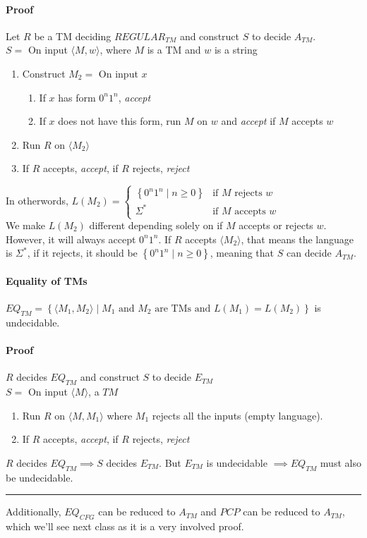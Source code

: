\documentclass[12 pt]{article}
\begin{document}
\paragraph{Proof} Let $R$ be a TM deciding $REGULAR_{TM}$ and
construct $S$ to decide $A_{TM}$.
\\ $S = $ On input $\langle M,w \rangle$, where $M$ is a TM and $w$ is
a string
\begin{enumerate}
\item Construct $M_2 =$ On input $x$
  \begin{enumerate}
  \item If $x$ has form $0^n1^n$, \textit{accept}
  \item If $x$ does not have this form, run $M$ on $w$ and
    \textit{accept} if $M$ accepts $w$
  \end{enumerate}
\item Run $R$ on $\langle M_2 \rangle$
\item If $R$ accepts, \textit{accept}, if $R$ rejects, \textit{reject}
\end{enumerate}
In otherwords, $\displaystyle L(M_2) =
\begin{cases}
  \left\{0^n1^n \mid n \geq 0\right\} & \text{if }M \text{ rejects }w
  \\ \Sigma^* & \text{if }M \text{ accepts }w
\end{cases}
$ \\We make $L(M_2)$ different depending solely on if $M$ accepts or
rejects $w$. However, it will always accept $0^n1^n$. If $R$ accepts
$\langle M_2 \rangle$, that means the language is $\Sigma^*$, if it
rejects, it should be $\left\{0^n1^n \mid n \geq 0\right\}$, meaning
that $S$ can decide $A_{TM}$.
\paragraph{Equality of TMs}
$EQ_{TM} = \left\{\langle M_1,M_2 \rangle \mid M_1 \text{ and }M_2
  \text{ are TMs and } L(M_1) = L(M_2)\right\}$ is undecidable.
\paragraph{Proof} $R$ decides $EQ_{TM}$ and construct $S$ to decide
$E_{TM}$
\\ $S = $ On input $\langle M \rangle$, a $TM$
\begin{enumerate}
\item Run $R$ on $\langle M, M_1 \rangle$ where $M_1$ rejects all the
  inputs (empty language).
\item If $R$ accepts, \textit{accept}, if $R$ rejects, \textit{reject}
\end{enumerate}
$R$ decides $EQ_{TM} \implies S$ decides $E_{TM}$. But $E_{TM}$ is
undecidable $\implies EQ_{TM}$ must also be undecidable.
\\ \noindent \rule{\textwidth}{0.5pt}
Additionally, $EQ_{CFG}$ can be reduced to $A_{TM}$ and $PCP$ can be
reduced to $A_{TM}$, which we'll see next class as it is a very
involved proof.
\end{document}
